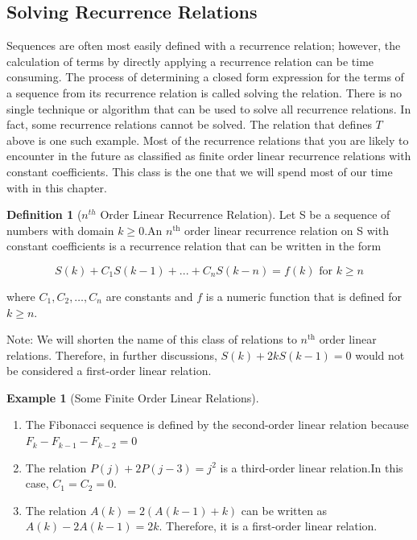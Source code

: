\documentclass[10pt,]{book}
\theoremstyle{plain}
\theoremstyle{definition}
\newtheorem{definition}[theorem]{Definition}
\theoremstyle{definition}
\theoremstyle{definition}
\newtheorem{example}[theorem]{Example}
\theoremstyle{definition}
\numberwithin{equation}{section}
\begin{document}
\subsection[Solving Recurrence Relations]{Solving Recurrence Relations}\label{ss-solving-recurrence-relations}
Sequences are often most easily defined with a recurrence relation; however, the calculation of terms by directly applying a recurrence relation
can be time consuming. The process of determining a closed form expression for the terms of a sequence from its recurrence relation is called solving
the relation. There is no single technique or algorithm that can be used to solve all recurrence relations. In fact, some recurrence relations cannot
be solved. The relation that defines \(T\) above is one such example. Most of the recurrence relations that you are likely to encounter in
the future as classified as finite order linear recurrence relations with constant coefficients. This class is the one that we will spend most of
our time with in this chapter.%
\begin{definition}[\(n^{th}\) Order Linear Recurrence Relation]\label{def-n-th-order-rr}
Let S be a sequence of numbers with domain \(k\geq 0\).An \(n^{\textrm{th}}\)
order linear recurrence relation on S with constant coefficients is a recurrence relation that can be written in the form

\[S(k) + C_1 S(k - 1) + . . . + C_n S(k - n) = f(k)\textrm{  for  }k \geq  n\]

where \(C_1, C_2, \ldots , C_n\) are constants and \(f\) is a numeric function that is defined for \(k \geq n\).%
\end{definition}
\par
Note: We will shorten the name of this class of relations to \(n^{\textrm{th}}\) order linear relations. Therefore, in further discussions, \(S(k)
+ 2k S(k - 1) = 0\) would not be considered a first-order linear relation.%
\begin{example}[Some Finite Order Linear  Relations]\label{ex-some-finite-order-rr}
\leavevmode%
\begin{enumerate}[label=\alph*]
\item\hypertarget{li-29}{}The Fibonacci sequence is defined by the second-order linear relation because \(F_k- F_{k-1}- F_{k-2}=0\)%
\item\hypertarget{li-30}{} The relation \(P(j) + 2P(j - 3) = j^2\) is a third-order linear relation.In this case, \(C_1= C_2= 0\).%
\item\hypertarget{li-31}{} The relation \(A(k)= 2(A(k - 1) + k)\) can be written as \(A(k) - 2A(k - 1) = 2k\). Therefore, it is a first-order linear relation.
%
\end{enumerate}
%
\end{example}
\typeout{************************************************}
\typeout{************************************************}
\end{document}
